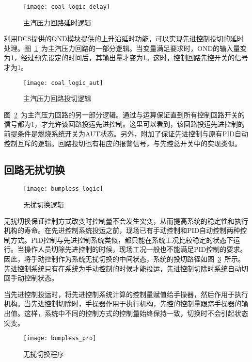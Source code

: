 \begin{figure}[!hbt]
\centering
\texttt{[image: coal\_logic\_delay]}
\caption{主汽压力回路延时逻辑} \label{fig:coal_logic_delay}
\end{figure}
 
利用DCS提供的OND模块提供的上升沿延时功能，可以实现先进控制投切的延时处理。图~\ref{fig:coal_logic_delay}~为主汽压力回路的一部分逻辑。当变量满足要求时，OND的输入量变为1，经过预先设定的时间后，其输出量才变为1。这时，控制回路先控开关的信号才为1。

\begin{figure}[!hbt]
\centering
\texttt{[image: coal\_logic\_aut]}
\caption{主汽压力回路投切逻辑} \label{fig:coal_logic_aut}
\end{figure}

图~\ref{fig:coal_logic_aut}~为主汽压力回路的另一部分逻辑。通过与运算保证直到所有控制回路开关的信号都为1，才允许该回路投运先进控制。这里可以看到，该回路投运先进控制的前提条件是燃烧系统开关为AUT状态。另外，附加了保证先进控制与原有PID自动控制互斥的逻辑。回路投切也有相应的报警信号，与先控总开关中的实现类似。
  
\subsection{回路无扰切换}

\begin{figure}[!hbt]
\centering
\texttt{[image: bumpless\_logic]}
\caption{无扰切换逻辑} \label{fig:bumpless_logic}
\end{figure}
 
无扰切换保证控制方式改变时控制量不会发生突变，从而提高系统的稳定性和执行机构的寿命。在先进控制系统投运之前，现场已有手动控制和PID自动控制两种控制方式。PID控制与先进控制系统类似，都只能在系统工况比较稳定的状态下运行。当操作人员切除先进控制的时候，现场工况一般也不能满足PID控制的要求。因此，将手动控制作为系统无扰切换的中间状态，系统的投切路径如图~\ref{fig:bumpless_logic}~所示。先进控制系统只有在系统为手动控制的时候才能投运，先进控制切除时系统自动切回手动控制状态。

当先进控制投运时，将先进控制系统计算的控制量赋值给手操器，然后作用于执行机构。当先进控制切除时，手操器作用于执行机构，先控的控制量跟踪手操器的输出值。这样，系统中不同的控制方式的控制量始终保持一致，切换时不会引起状态突变。

\begin{figure}[!hbt]
\centering
\texttt{[image: bumpless\_pro]}
\caption{无扰切换程序} \label{fig:bumpless_pro}
\end{figure}

